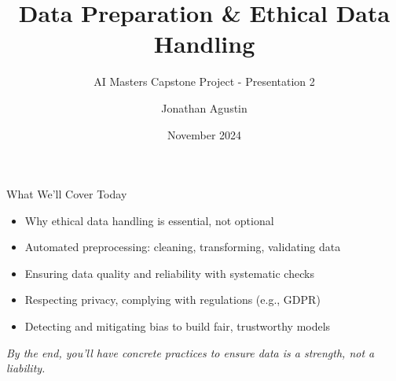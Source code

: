 \documentclass[aspectratio=169]{beamer}
\title{Data Preparation \& Ethical Data Handling}
\subtitle{AI Masters Capstone Project - Presentation 2}
\author{Jonathan Agustin}
\date{November 2024}
\begin{document}
%
%
%
\maketitle

%
\begin{frame}{What We’ll Cover Today}
\begin{itemize}
\item Why ethical data handling is essential, not optional
\item Automated preprocessing: cleaning, transforming, validating data
\item Ensuring data quality and reliability with systematic checks
\item Respecting privacy, complying with regulations (e.g., GDPR)
\item Detecting and mitigating bias to build fair, trustworthy models
\end{itemize}

\vspace{0.8em}
\emph{By the end, you’ll have concrete practices to ensure data is a strength, not a liability.}
\end{frame}
\end{document}
